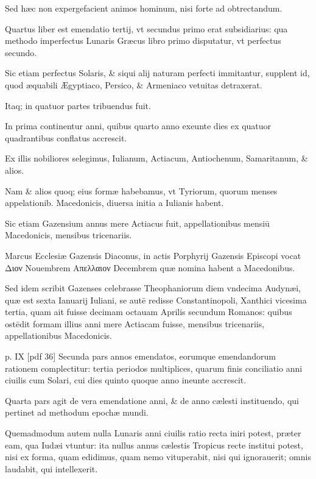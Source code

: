 \begin{parnumbers}
Sed hæc non expergefacient animos
hominum, nisi forte ad obtrectandum.

Quartus liber est emendatio
tertij, vt secundus primo erat subsidiarius: qua methodo imperfectus
Lunaris Græcus libro primo disputatur, vt perfectus secundo.

Sic etiam perfectus Solaris, \& siqui alij naturam perfecti immitantur,
supplent id, quod æquabili Ægyptiaco, Persico, \& Armeniaco
vetuitas detraxerat.

Itaq; in quatuor partes tribuendus fuit.

In
prima continentur anni, quibus quarto anno exeunte dies ex quatuor
quadrantibus conflatus accrescit.

Ex illis nobiliores selegimus,
Iulianum, Actiacum, Antiochenum, Samaritanum, \& alios. 

Nam \& alios quoq; eius formæ habebamus, vt Tyriorum, quorum menses
appelationib. Macedonicis, diuersa initia a Iulianis habent.

Sic
etiam Gazensium annus mere Actiacus fuit, appellationibus mensiū 
Macedonicis, mensibus tricenariis. 

Marcus Ecclesiæ Gazensis Diaconus,
in actis Porphyrij Gazensis Episcopi vocat \textgreek{Διον} Nouembrem
\textgreek{Απελλαιον} Decembrem quæ nomina habent a Macedonibus. 

Sed
idem scribit Gazenses celebrasse Theophaniorum diem vndecima
Audynæi, quæ est sexta Ianuarij Iuliani, se autē redisse Constantinopoli,
Xanthici vicesima tertia, quam ait fuisse decimam octauam
Aprilis secundum Romanos: quibus ostēdit formam illius anni mere
Actiacam fuisse, mensibus tricenariis, appellationibus Macedonicis. 

\clearpage
p. IX [pdf 36]
Secunda pars annos emendatos, eorumque emendandorum
rationem complectitur: tertia periodos multiplices, quarum finis
conciliatio anni ciuilis cum Solari, cui dies quinto quoque anno
ineunte accrescit.

Quarta pars agit de vera emendatione anni, \&
de anno cælesti instituendo, qui pertinet ad methodum epochæ
mundi.

Quemadmodum autem nulla Lunaris anni ciuilis ratio
recta iniri potest, præter eam, qua Iudæi vtuntur: ita nullus annus
cælestis Tropicus recte institui potest, nisi ex forma, quam edidimus,
quam nemo vituperabit, nisi qui ignorauerit; omnis laudabit,
qui intellexerit.


\end{parnumbers}
